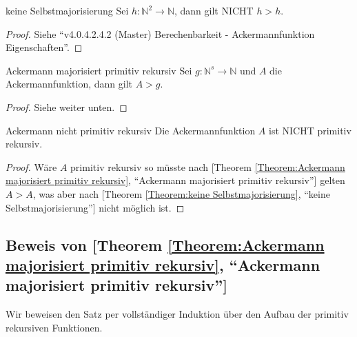 \documentclass[a4paper]{amsart}
\theoremstyle{definition}
\newcommand{\myRef}[2]{[#1 \ref{#1:#2}, ``#2'']}
\newcommand{\N}{\ensuremath{\mathbb{ N }}}
\begin{document}
\begin{Theorem}{keine Selbstmajorisierung}
    Sei $h \colon \N^2 \to \N$, dann gilt NICHT $h > h$.   
\end{Theorem}
\begin{proof}
    Siehe "`v4.0.4.2.4.2 (Master) Berechenbarkeit - Ackermannfunktion Eigenschaften"'. 
\end{proof}

\begin{Theorem}{Ackermann majorisiert primitiv rekursiv}
    Sei $g \colon \N^s \to \N$ und $A$ die Ackermannfunktion, dann gilt $A > g$.   
\end{Theorem}
\begin{proof}
    Siehe weiter unten. 
\end{proof}

\begin{Theorem}{Ackermann nicht primitiv rekursiv}
    Die Ackermannfunktion $A$ ist NICHT primitiv rekursiv. 
\end{Theorem}
\begin{proof}
    Wäre $A$ primitiv rekursiv so müsste nach \myRef{Theorem}{Ackermann majorisiert primitiv rekursiv} 
    gelten $A > A$, was aber nach \myRef{Theorem}{keine Selbstmajorisierung} nicht möglich ist.
\end{proof}

\subsection{Beweis von \myRef{Theorem}{Ackermann majorisiert primitiv rekursiv} }
Wir beweisen den Satz per vollständiger Induktion über den Aufbau der primitiv rekursiven Funktionen.
\end{document}
